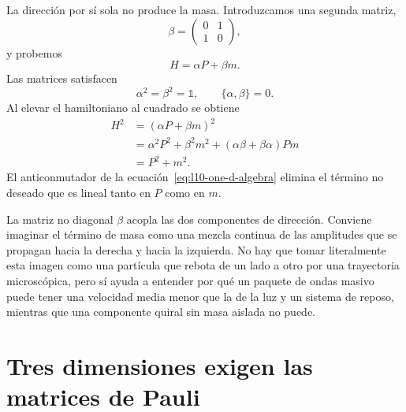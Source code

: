 La dirección por sí sola no produce la masa. Introduzcamos una segunda matriz,
\begin{equation}
\beta=
\begin{pmatrix}
0&1\\
1&0
\end{pmatrix},
\end{equation}
y probemos
\begin{equation}
H=\alpha P+\beta m.
\label{eq:l10-massive-one-d}
\end{equation}
Las matrices satisfacen
\begin{equation}
\alpha^2=\beta^2=\mathbb{1},
\qquad
\{\alpha,\beta\}=0.
\label{eq:l10-one-d-algebra}
\end{equation}
Al elevar el hamiltoniano al cuadrado se obtiene
\begin{align}
H^2
&=(\alpha P+\beta m)^2\\
&=\alpha^2P^2+\beta^2m^2
  +(\alpha\beta+\beta\alpha)Pm\\
&=P^2+m^2.
\label{eq:l10-one-d-dispersion}
\end{align}
El anticonmutador de la ecuación~\eqref{eq:l10-one-d-algebra} elimina el término no deseado que es lineal tanto en \(P\) como en \(m\).

La matriz no diagonal \(\beta\) acopla las dos componentes de dirección. Conviene imaginar el término de masa como una mezcla continua de las amplitudes que se propagan hacia la derecha y hacia la izquierda. No hay que tomar literalmente esta imagen como una partícula que rebota de un lado a otro por una trayectoria microscópica, pero sí ayuda a entender por qué un paquete de ondas masivo puede tener una velocidad media menor que la de la luz y un sistema de reposo, mientras que una componente quiral sin masa aislada no puede.

\begin{classroomqa}
\end{classroomqa}

\section{Tres dimensiones exigen las matrices de Pauli}

